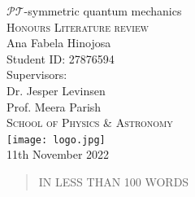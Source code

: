 \documentclass[12pt, a4paper]{report}
\begin{document}
\begin{titlingpage}
  \begin{center}
  \vspace{2cm}
  {\Huge \( \mathcal{PT} \)-symmetric quantum mechanics}\\
  \vspace{0.5cm}
  \textsc{Honours Literature review}\\
  \vspace{1cm}
  {\Large Ana Fabela Hinojosa\\Student ID: 27876594}\\
  \vspace{0.5cm}
  {\Large Supervisors:\\ Dr. Jesper Levinsen \\ Prof. Meera Parish}\\
  \textsc{School of Physics \& Astronomy}\\
  \vspace{0.5cm}
  \texttt{[image: logo.jpg]} \\ %
  {11th November 2022}\\
  \end{center}

  \begin{abstract}
  IN LESS THAN 100 WORDS







  \end{abstract}
\end{titlingpage}
\end{document}
